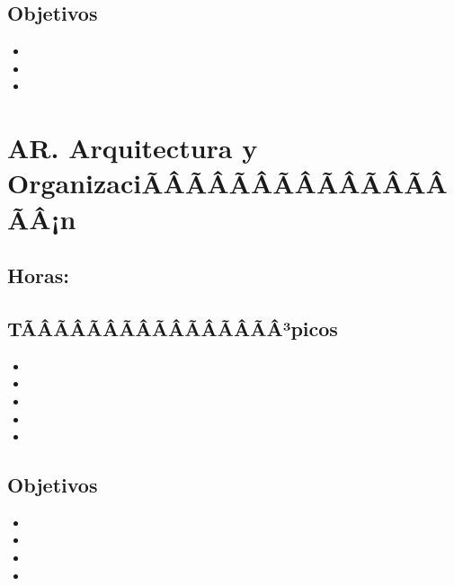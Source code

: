 \subsection*{Objetivos}
\begin{itemize}
	\item \ALONCEObjUNO
	\item \ALONCEObjDOS
	\item \ALONCEObjTRES
\end{itemize}

\section{AR. Arquitectura y OrganizaciÃÂÃÂÃÂÃÂÃÂÃÂÃÂÃÂ¡n}\label{sec:BOK-AR}

\subsection{\ARUNODef}\label{sec:BOK-AR1}
\subsection*{Horas: \ARUNOHours}

\subsection*{TÃÂÃÂÃÂÃÂÃÂÃÂÃÂÃÂ³picos}
\begin{itemize}
	\item \ARUNOTopicVista
	\item \ARUNOTopicBloques
	\item \ARUNOTopicExpresiones
	\item \ARUNOTopicNotacion
	\item \ARUNOTopicConsideraciones
\end{itemize}

\subsection*{Objetivos}
\begin{itemize}
	\item \ARUNOObjUNO
	\item \ARUNOObjDOS
	\item \ARUNOObjTRES
	\item \ARUNOObjCUATRO
\end{itemize}

\subsection{\ARDOSDef}\label{sec:BOK-AR2}
